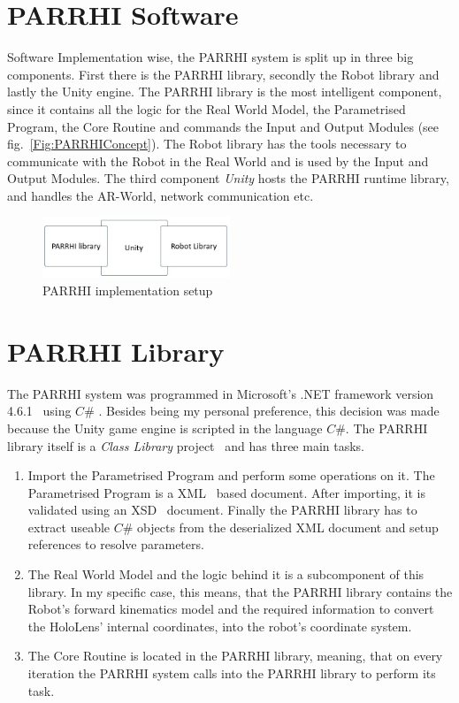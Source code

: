 \section{PARRHI Software}\label{Section:PARRHIHardware}
Software Implementation wise, the PARRHI system is split up in three big components. First there is the PARRHI library, secondly the Robot library and lastly the Unity engine. The PARRHI library is the most intelligent component, since it contains all the logic for the Real World Model, the Parametrised Program, the Core Routine and commands the Input and Output Modules (see fig.~\ref{Fig:PARRHIConcept}). The Robot library has the tools necessary to communicate with the Robot in the Real World and is used by the Input and Output Modules. The third component \textit{Unity} hosts the PARRHI runtime library, and handles the AR-World, network communication etc.


\begin{figure}[!h]
	\centering
	\includegraphics[width=0.5\textwidth]{Figures/Implementation_SystemSetup.jpg}
	\caption{PARRHI implementation setup}
	\label{Fig:Implementation}
\end{figure}


\section{PARRHI Library}
The PARRHI system was programmed in Microsoft's .NET framework version 4.6.1~\cite{NETFramework} using $C\#$ \cite{CSharp}. Besides being my personal preference, this decision was made because the Unity game engine is scripted in the language $C\#$. The PARRHI library itself is a \textit{Class Library} project~\cite{ClassLibrary} and has three main tasks.

\begin{enumerate}
	\item Import the Parametrised Program and perform some operations on it. The Parametrised Program is a XML~\cite{xmlW3C} based document. After importing, it is validated using an XSD~\cite{xsdW3C} document. Finally the PARRHI library has to extract useable $C\#$ objects from the deserialized XML document and setup references to resolve parameters.
	\item The Real World Model and the logic behind it is a subcomponent of this library. In my specific case, this means, that the PARRHI library contains the Robot's forward kinematics model and the required information to convert the HoloLens' internal coordinates, into the robot's coordinate system.
	\item The Core Routine is located in the PARRHI library, meaning, that on every iteration the PARRHI system calls into the PARRHI library to perform its task.
\end{enumerate}

